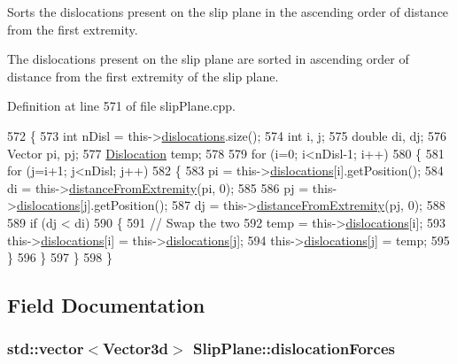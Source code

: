 Sorts the dislocations present on the slip plane in the ascending order of distance from the first extremity. 

The dislocations present on the slip plane are sorted in ascending order of distance from the first extremity of the slip plane. 

Definition at line 571 of file slip\-Plane.\-cpp.


\begin{DoxyCode}
572 \{
573   \textcolor{keywordtype}{int} nDisl = this->\hyperlink{classSlipPlane_ad92c7c409f7e161db449528389180910}{dislocations}.size();
574   \textcolor{keywordtype}{int} i, j;
575   \textcolor{keywordtype}{double} di, dj;
576   Vector pi, pj;
577   \hyperlink{classDislocation}{Dislocation} temp;
578 
579   \textcolor{keywordflow}{for} (i=0; i<nDisl-1; i++)
580     \{
581       \textcolor{keywordflow}{for} (j=i+1; j<nDisl; j++)
582         \{
583           pi = this->\hyperlink{classSlipPlane_ad92c7c409f7e161db449528389180910}{dislocations}[i].getPosition();
584           di = this->\hyperlink{classSlipPlane_a3523030cccb520b5253a811d062f3ddf}{distanceFromExtremity}(pi, 0);
585           
586           pj = this->\hyperlink{classSlipPlane_ad92c7c409f7e161db449528389180910}{dislocations}[j].getPosition();
587           dj = this->\hyperlink{classSlipPlane_a3523030cccb520b5253a811d062f3ddf}{distanceFromExtremity}(pj, 0);
588           
589           \textcolor{keywordflow}{if} (dj < di)
590             \{
591               \textcolor{comment}{// Swap the two}
592               temp = this->\hyperlink{classSlipPlane_ad92c7c409f7e161db449528389180910}{dislocations}[i];
593               this->\hyperlink{classSlipPlane_ad92c7c409f7e161db449528389180910}{dislocations}[i] = this->\hyperlink{classSlipPlane_ad92c7c409f7e161db449528389180910}{dislocations}[j];
594               this->\hyperlink{classSlipPlane_ad92c7c409f7e161db449528389180910}{dislocations}[j] = temp;
595             \}
596         \}
597     \}
598 \}
\end{DoxyCode}


\subsection{Field Documentation}
\hypertarget{classSlipPlane_a2a74ae1f66a59e53a3ca0c9b81b28f7d}{
\subsubsection[{dislocation\-Forces}]{\setlength{\rightskip}{0pt plus 5cm}std\-::vector$<${\bf Vector3d}$>$ Slip\-Plane\-::dislocation\-Forces\hspace{0.3cm}{\ttfamily [protected]}}}\label{db/d25/classSlipPlane_a2a74ae1f66a59e53a3ca0c9b81b28f7d}


